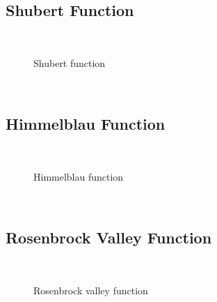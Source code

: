 \subsection{Shubert Function}
~
\begin{figure}[ht]
	\centering
	\setlength \fboxsep{0pt}
	\setlength \fboxrule{0.5pt}
	\caption{Shubert function}
	\label{fig:ShubertGraph}
\end{figure}
~
\subsection{Himmelblau Function}
~
\begin{figure}[ht]
	\centering
	\setlength \fboxsep{0pt}
	\setlength \fboxrule{0.5pt}
	\caption{Himmelblau function}
	\label{fig:HimmelblaueGraph}
\end{figure}
~
\subsection{Rosenbrock Valley Function}
~
\begin{figure}[ht]
	\centering
	\setlength \fboxsep{0pt}
	\setlength \fboxrule{0.5pt}
	\caption{Rosenbrock valley function}
	\label{fig:Rosenbrock}
\end{figure}
~
